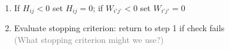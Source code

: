 \documentclass[xcolor={dvipsnames}]{beamer}
\begin{document}
{\begin{itemize}
\begin{enumerate}
\tiny
$$\arraycolsep=3pt%
\left[\begin{array}{cccc} & \text{---} &\text{---}& \\&  && \\&  &&  \end{array} \right]^T = \left( \left[\begin{array}{c}\longrightarrow \longrightarrow \\ \\ \\ \end{array} \right] \left[\begin{array}{cccc} \downarrow & \downarrow & \downarrow& \downarrow \\ \downarrow&  \downarrow  & \downarrow& \downarrow  \\ \downarrow&  \downarrow  & \downarrow& \downarrow \end{array} \right] \right)^T$$

\normalsize

\item If $H_{ij}<0$ set $H_{ij}=0$; if $W_{i'j'}<0$ set $W_{i'j'}=0$
\item Evaluate stopping criterion: return to step 1 if check fails\\
\textcolor{gray}{(What stopping criterion might we use?)}
\end{enumerate}
\end{itemize}

}
\end{document}
